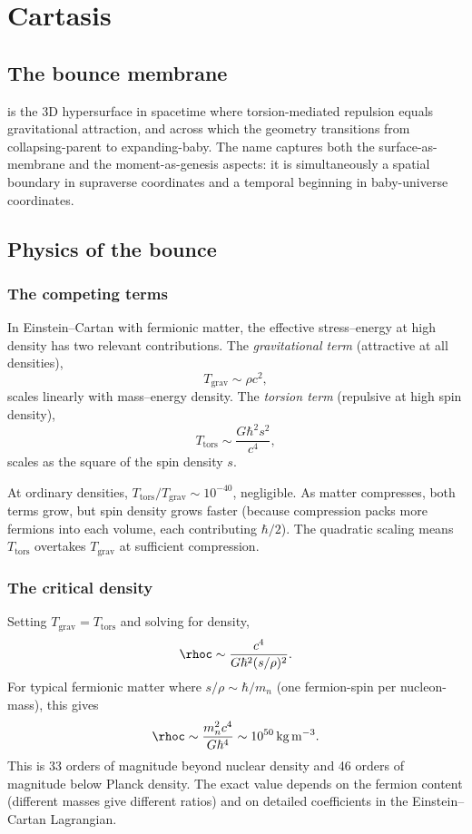 \chapter{Cartasis}
\label{chap:cartasis}

\section{The bounce membrane}

\Cartasis is the 3D hypersurface in spacetime where torsion-mediated repulsion
equals gravitational attraction, and across which the geometry transitions from
collapsing-parent to expanding-baby. The name captures both the
surface-as-membrane and the moment-as-genesis aspects: it is simultaneously a
spatial boundary in supraverse coordinates and a temporal beginning in
baby-universe coordinates.

\section{Physics of the bounce}

\subsection{The competing terms}

In Einstein--Cartan with fermionic matter, the effective stress--energy at high
density has two relevant contributions. The \emph{gravitational term}
(attractive at all densities),
\[
  T_{\text{grav}} \sim \rho c^2,
\]
scales linearly with mass--energy density. The \emph{torsion term} (repulsive at
high spin density),
\[
  T_{\text{tors}} \sim \frac{G \hbar^2 s^2}{c^4},
\]
scales as the square of the spin density $s$.

At ordinary densities, $T_{\text{tors}} / T_{\text{grav}} \sim 10^{-40}$,
negligible. As matter compresses, both terms grow, but spin density grows faster
(because compression packs more fermions into each volume, each contributing
$\hbar/2$). The quadratic scaling means $T_{\text{tors}}$ overtakes
$T_{\text{grav}}$ at sufficient compression.

\subsection{The critical density}

Setting $T_{\text{grav}} = T_{\text{tors}}$ and solving for density,
\[
  \rhoc \sim \frac{c^4}{G \hbar^2 (s/\rho)^2}.
\]
For typical fermionic matter where $s/\rho \sim \hbar/m_n$ (one fermion-spin per
nucleon-mass), this gives
\[
  \rhoc \sim \frac{m_n^2 c^4}{G \hbar^4} \sim 10^{50}\,\mathrm{kg\,m^{-3}}.
\]
This is 33 orders of magnitude beyond nuclear density and 46 orders of magnitude
below Planck density. The exact value depends on the fermion content (different
masses give different ratios) and on detailed coefficients in the
Einstein--Cartan Lagrangian.

